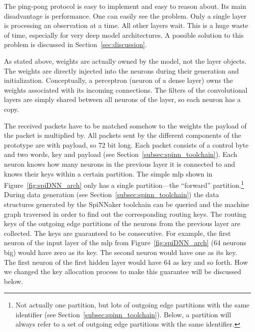 \documentclass[]{article}
\begin{document}
The ping-pong protocol is easy to implement and easy to reason about.
Its main disadvantage is performance.
One can easily see the problem.
Only a single layer is processing an observation at a time.
All other layers wait.
This is a huge waste of time, especially for very deep model
architectures.
A possible solution to this problem is discussed in
Section~\ref{sec:discussion}.

As stated above, weights are actually owned by the model, not
the layer objects.
The weights are directly injected into the neurons during their
generation and initialization.
Conceptually, a perceptron (neuron of a dense layer) owns the weights
associated with its incoming connections.
The filters of the convolutional layers are simply shared between
all neurons of the layer, so each neuron has a copy.

The received packets have to be matched somehow to the weights
the payload of the packet is multiplied by.
All packets sent by the different components of the prototype are
with payload, so 72 bit long.
Each packet consists of a control byte and two words, key and payload
(see Section~\ref{subsec:spinn_toolchain}).
Each neuron knows how many neurons in the previous layer it is
connected to and knows their keys within a certain partition.
The simple \acrshort{mlp} shown in Figure~\ref{fig:spiDNN_arch} only has a
single partition---the ``forward'' partition.\footnote{%
  Not actually one
  partition, but lots of outgoing edge partitions with the same
  identifier (see Section~\ref{subsec:spinn_toolchain}).
  Below, a partition will always refer to a set of outgoing edge
  partitions with the same identifier.}
During data generation (see Section~\ref{subsec:spinn_toolchain})
the data structures generated by the SpiNNaker toolchain can be
queried and the machine graph traversed in order to find out the
corresponding routing keys.
The routing keys of the outgoing edge partitions of the neurons
from the previous layer are collected.
The keys are guaranteed to be consecutive.
For example, the first neuron of the input layer of the \acrshort{mlp} from
Figure~\ref{fig:spiDNN_arch} (64 neurons big) would have zero as its
key.
The second neuron would have one as its key.
The first neuron of the first hidden layer would have 64 as key and so
forth.
How we changed the key allocation process to make this guarantee will
be discussed below.
\end{document}
